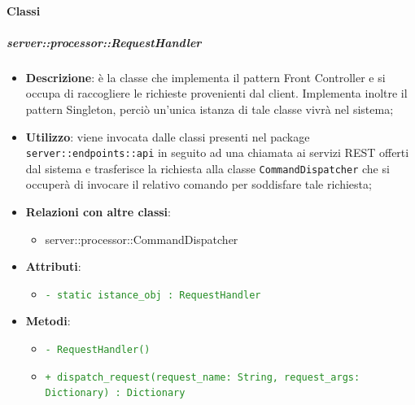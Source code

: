   \paragraph{Classi} %

\subparagraph{server::processor::RequestHandler} %
    \label{subp:bdsm_app_server_processor_requesthandler}
    \begin{itemize}
      \item \textbf{Descrizione}: è la classe che implementa il pattern Front Controller e si occupa di raccogliere le richieste provenienti dal client. Implementa inoltre il pattern Singleton, perciò un'unica istanza di tale classe vivrà nel sistema;
      \item \textbf{Utilizzo}: viene invocata dalle classi presenti nel package \texttt{server::endpoints::api} in seguito ad una chiamata ai servizi REST offerti dal sistema e trasferisce la richiesta alla classe \texttt{CommandDispatcher} che si occuperà di invocare il relativo comando per soddisfare tale richiesta;
      \item \textbf{Relazioni con altre classi}:
        \begin{itemize}
          \item server::processor::CommandDispatcher
        \end{itemize}
      \item \textbf{Attributi}:
          \begin{itemize}
              \item \textcolor{forestgreen}{\texttt{- static istance\_obj : RequestHandler}}
          \end{itemize}
      \item \textbf{Metodi}:
          \begin{itemize}
             \item \textcolor{forestgreen}{\texttt{- RequestHandler()}}
             \item \textcolor{forestgreen}{\texttt{+ dispatch\_request(request\_name: String, request\_args: Dictionary) : Dictionary}}

\end{itemize}
\end{itemize}
